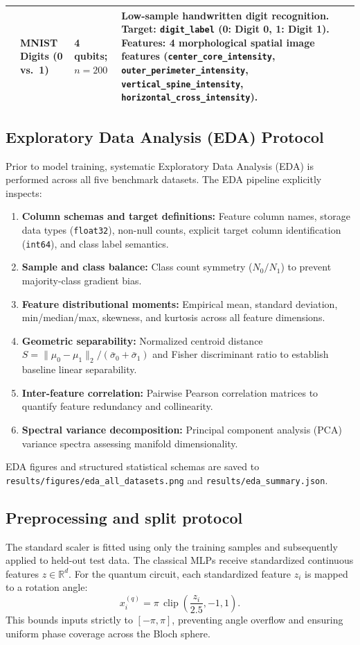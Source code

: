 \begin{table}[!htbp]
\begin{tabularx}{\linewidth}{@{}l l l >{\raggedright\arraybackslash}X@{}}
& MNIST Digits (0 vs.\ 1) & 4 qubits; $n=200$ & Low-sample handwritten digit recognition. Target: \texttt{digit\_label} (0: Digit 0, 1: Digit 1). Features: 4 morphological spatial image features (\texttt{center\_core\_intensity}, \texttt{outer\_perimeter\_intensity}, \texttt{vertical\_spine\_intensity}, \texttt{horizontal\_cross\_intensity}).\\
\bottomrule
\end{tabularx}
\label{tab:datasets}
\end{table}

\subsection{Exploratory Data Analysis (EDA) Protocol}
Prior to model training, systematic Exploratory Data Analysis (EDA) is performed across all five benchmark datasets. The EDA pipeline explicitly inspects:
\begin{enumerate}
  \item \textbf{Column schemas and target definitions:} Feature column names, storage data types (\texttt{float32}), non-null counts, explicit target column identification (\texttt{int64}), and class label semantics.
  \item \textbf{Sample and class balance:} Class count symmetry ($N_0/N_1$) to prevent majority-class gradient bias.
  \item \textbf{Feature distributional moments:} Empirical mean, standard deviation, min/median/max, skewness, and kurtosis across all feature dimensions.
  \item \textbf{Geometric separability:} Normalized centroid distance $S = \|\mu_0 - \mu_1\|_2 / (\bar{\sigma}_0 + \bar{\sigma}_1)$ and Fisher discriminant ratio to establish baseline linear separability.
  \item \textbf{Inter-feature correlation:} Pairwise Pearson correlation matrices to quantify feature redundancy and collinearity.
  \item \textbf{Spectral variance decomposition:} Principal component analysis (PCA) variance spectra assessing manifold dimensionality.
\end{enumerate}
EDA figures and structured statistical schemas are saved to \texttt{results/figures/eda\_all\_datasets.png} and \texttt{results/\allowbreak eda\_summary.json}.

\subsection{Preprocessing and split protocol}
The standard scaler is fitted using only the training samples and subsequently applied to held-out test data. The classical MLPs receive standardized continuous features $z \in \mathbb{R}^d$. For the quantum circuit, each standardized feature $z_i$ is mapped to a rotation angle:
\begin{equation}
  x_i^{(q)} = \pi\,\operatorname{clip}\!\left(\frac{z_i}{2.5},-1,1\right).
\end{equation}
This bounds inputs strictly to $[-\pi,\pi]$, preventing angle overflow and ensuring uniform phase coverage across the Bloch sphere.

